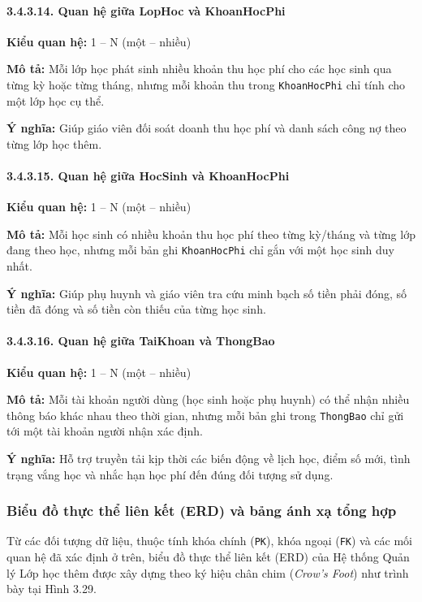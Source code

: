 \documentclass[12pt,a4paper]{article}
\begin{document}
\paragraph{3.4.3.14. Quan hệ giữa LopHoc và KhoanHocPhi}\mbox{}\par
\textbf{Kiểu quan hệ:} 1 -- N (một -- nhiều)\par
\textbf{Mô tả:} Mỗi lớp học phát sinh nhiều khoản thu học phí cho các học sinh qua từng kỳ hoặc từng tháng, nhưng mỗi khoản thu trong \texttt{KhoanHocPhi} chỉ tính cho một lớp học cụ thể.\par
\textbf{Ý nghĩa:} Giúp giáo viên đối soát doanh thu học phí và danh sách công nợ theo từng lớp học thêm.

\paragraph{3.4.3.15. Quan hệ giữa HocSinh và KhoanHocPhi}\mbox{}\par
\textbf{Kiểu quan hệ:} 1 -- N (một -- nhiều)\par
\textbf{Mô tả:} Mỗi học sinh có nhiều khoản thu học phí theo từng kỳ/tháng và từng lớp đang theo học, nhưng mỗi bản ghi \texttt{KhoanHocPhi} chỉ gắn với một học sinh duy nhất.\par
\textbf{Ý nghĩa:} Giúp phụ huynh và giáo viên tra cứu minh bạch số tiền phải đóng, số tiền đã đóng và số tiền còn thiếu của từng học sinh.

\paragraph{3.4.3.16. Quan hệ giữa TaiKhoan và ThongBao}\mbox{}\par
\textbf{Kiểu quan hệ:} 1 -- N (một -- nhiều)\par
\textbf{Mô tả:} Mỗi tài khoản người dùng (học sinh hoặc phụ huynh) có thể nhận nhiều thông báo khác nhau theo thời gian, nhưng mỗi bản ghi trong \texttt{ThongBao} chỉ gửi tới một tài khoản người nhận xác định.\par
\textbf{Ý nghĩa:} Hỗ trợ truyền tải kịp thời các biến động về lịch học, điểm số mới, tình trạng vắng học và nhắc hạn học phí đến đúng đối tượng sử dụng.

\subsubsection{Biểu đồ thực thể liên kết (ERD) và bảng ánh xạ tổng hợp}

Từ các đối tượng dữ liệu, thuộc tính khóa chính (\texttt{PK}), khóa ngoại (\texttt{FK}) và các mối quan hệ đã xác định ở trên, biểu đồ thực thể liên kết (ERD) của Hệ thống Quản lý Lớp học thêm được xây dựng theo ký hiệu chân chim (\textit{Crow's Foot}) như trình bày tại Hình 3.29.
\end{document}
